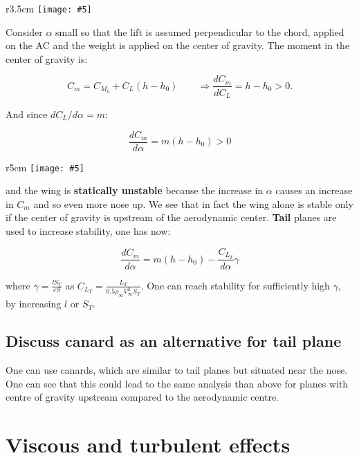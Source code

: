 \documentclass[british,french,11pt, a4paper, openany]{article}
\newcommand{\wrapfig}[6]{%
	\begin{wrapfigure}[#1]{#2}{#3cm}%
		\vspace{-5mm}%
		\texttt{[image: \#5]}%
		\captionof{figure}{}%
		\label{#6}%
	\end{wrapfigure}%
}
\begin{document}
\wrapfig{6}{r}{3.5}{0.15}{ch5/13}{ch5/13}
Consider $\alpha$ small so that the lift is assumed perpendicular to the chord, applied on the AC and the weight is applied on the center of gravity. The moment in the center of gravity is:

\begin{equation}
C_m = C_{M_0} + C_L (h-h_0) \qquad \Rightarrow \frac{dC_m}{dC_L} = h -h_0 > 0.
\end{equation}	 

And since $dC_L/d\alpha = m$:

\begin{equation}
\frac{dC_m}{d\alpha} = m(h-h_0)>0
\end{equation}

\wrapfig{5}{r}{5}{0.15}{ch5/14}{ch5/14}
and the wing is \textbf{statically unstable} because the increase in $\alpha$ causes an increase in $C_m$ and so even more nose up. We see that in fact the wing alone is stable only if the center of gravity is upstream of the aerodynamic center. 
\textbf{Tail} planes are used to increase stability, one has now: 

\begin{equation}
\frac{dC_m}{d\alpha} = m(h-h_0) - \frac{C_{L_T}}{d\alpha} \gamma 
\end{equation}

where $\gamma = \frac{l S_T}{cS}$ as $C_{L_T} = \frac{L_T}{0.5\rho _\infty V_\infty ^2 S_T}$. One can reach stability for sufficiently high $\gamma$, by increasing $l$ or $S_T$. 

\subsection{Discuss canard as an alternative for tail plane}
One can use canards, which are similar to tail planes but situated near the nose. One can see that this could lead to the same analysis than above for planes with centre of gravity upstream compared to the aerodynamic centre.


\section{Viscous and turbulent effects}
\end{document}
